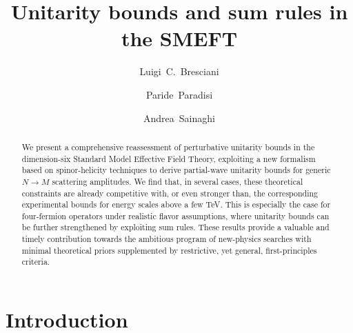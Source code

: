 \documentclass[
aps,
prd,
10pt,
twocolumn,
oneside,
preprintnumbers,
superscriptaddress,
amsmath,
amssymb,
nofootinbib,
flushbottom]{revtex4-2}
\begin{document}
\allowdisplaybreaks

\title{Unitarity bounds and sum rules in the SMEFT}

\author{Luigi~C.~Bresciani}

\author{Paride~Paradisi}

\author{Andrea~Sainaghi}

\begin{abstract}
We present a comprehensive reassessment of perturbative unitarity bounds in the dimension-six Standard Model Effective Field Theory, exploiting a new formalism based on spinor-helicity techniques to derive partial-wave unitarity bounds for generic $N \to M$ scattering amplitudes. We find that, in several cases, these theoretical constraints are already competitive with, or even stronger than, the corresponding experimental bounds for energy scales above a few TeV. This is especially the case for four-fermion operators under realistic flavor assumptions, where unitarity bounds can be further strengthened by exploiting sum rules. These results provide a valuable and timely contribution towards the ambitious program of new-physics searches with minimal theoretical priors supplemented by restrictive, yet general, first-principles criteria.

\end{abstract}

\maketitle

\section{Introduction}
\end{document}
